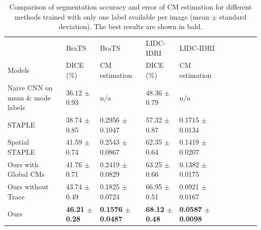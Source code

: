 \begin{table}[!t]
\scriptsize
	\center
	\begin{tabular}{@{}llllllllll}
		\hline
		 & BraTS & BraTS  & LIDC-IDRI  & LIDC-IDRI  \\
		Models & DICE (\%) & CM estimation & DICE (\%) & CM estimation \\
		  
		\hline	
		Naive CNN on mean \& mode labels& 36.12 $\pm$ 0.93  &  n/a & 48.36 $\pm$ 0.79   &  n/a  \\
		STAPLE \cite{warfield2004simultaneous}& 38.74 $\pm$ 0.85  & 0.2956 $\pm$ 0.1047  & 57.32 $\pm$ 0.87  & 0.1715 $\pm$ 0.0134     \\ 
		Spatial STAPLE \cite{asman2012formulating} & 41.59 $\pm$ 0.74  & 0.2543 $\pm$ 0.0867  & 62.35 $\pm$ 0.64  & 0.1419 $\pm$ 0.0207    \\
 		Ours with Global CMs  & 41.76 $\pm$ 0.71  & 0.2419 $\pm$ 0.0829   & 63.25 $\pm$ 0.66  & 0.1382 $\pm$ 0.0175    \\
		Ours without Trace & 43.74 $\pm$ 0.49   & 0.1825 $\pm$ 0.0724   & 66.95 $\pm$ 0.51  & 0.0921 $\pm$ 0.0167   \\
		Ours & \textbf{46.21 $\pm$ 0.28}   & \textbf{0.1576 $\pm$ 0.0487 }  & \textbf{68.12 $\pm$ 0.48}  & \textbf{0.0587 $\pm$ 0.0098   } \\
		\hline
	\end{tabular}%
    \caption{Comparison of segmentation accuracy and error of CM estimation for different methods trained with only one label available per image (mean $\pm$ standard deviation). The best results are shown in bald.}
    \label{singlelabebrats}
\end{table}

